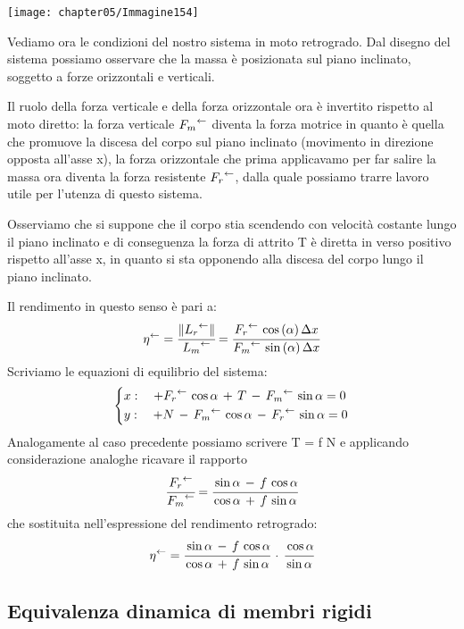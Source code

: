 \begin{itemize}
\begin{minipage}{.5\textwidth}
\centering
\texttt{[image: chapter05/Immagine154]}
\end{minipage}
\hfill
\begin{minipage}{.5\textwidth}
Vediamo ora le condizioni del nostro sistema in moto retrogrado. Dal disegno del sistema possiamo osservare che la massa è posizionata sul piano inclinato, soggetto a forze orizzontali e verticali.

Il ruolo della forza verticale e della forza orizzontale ora è invertito rispetto al moto diretto: la forza verticale ${F_m}^{\leftarrow}$ diventa la forza motrice in quanto è quella che promuove la discesa del corpo sul piano inclinato (movimento in direzione opposta all'asse x), la forza orizzontale che prima applicavamo per far salire la massa ora diventa la forza resistente ${F_r}^{\leftarrow}$, dalla quale possiamo trarre lavoro utile per l'utenza di questo sistema.
\end{minipage}

Osserviamo che si suppone che il corpo stia scendendo con velocità costante lungo il piano inclinato e di conseguenza la forza di attrito T è diretta in verso positivo rispetto all'asse x, in quanto si sta opponendo alla discesa del corpo lungo il piano inclinato.

Il rendimento in questo senso è pari a:
\[{\eta}^{\leftarrow} = \cfrac{\lVert{L_r}^{\leftarrow}\rVert}{{L_m}^{\leftarrow}}=\cfrac{{F_r}^{\leftarrow}\,\cos{(\alpha)}\,\Delta x}{{F_m}^{\leftarrow}\,\sin{(\alpha)}\,\Delta x}\]
Scriviamo le equazioni di equilibrio del sistema:
\[
\begin{dcases}
x:\quad + {F_r}^{\leftarrow}\,\cos{\alpha}\,+\,T\,-\,{F_m}^{\leftarrow}\,\sin{\alpha} = 0\\
y:\quad + N\,-\,{F_m}^{\leftarrow}\,\cos{\alpha}\,-\,{F_r}^{\leftarrow}\,\sin{\alpha}=0
\end{dcases}
\]
Analogamente al caso precedente possiamo scrivere T = f N e applicando considerazione analoghe ricavare il rapporto
\[\cfrac{{F_r}^{\leftarrow}}{{F_m}^{\leftarrow}}=\cfrac{\sin{\alpha}\,-\,f\,\cos{\alpha}}{\cos{\alpha}\,+\,f\,\sin{\alpha}}\]
che sostituita nell'espressione del rendimento retrogrado:
\[{\eta}^{\leftarrow} = \cfrac{\sin{\alpha}\,-\,f\,\cos{\alpha}}{\cos{\alpha}\,+\,f\,\sin{\alpha}}\,\cdot\,\cfrac{\cos{\alpha}}{\sin{\alpha}}\]
\end{itemize}

\subsection{Equivalenza dinamica di membri rigidi}

